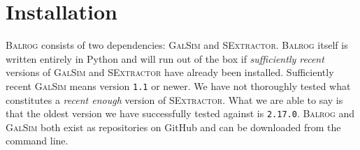 \documentclass[11pt]{book}
\newcommand{\codett}[1]{\texttt{#1}}
\newcommand{\py}{Python}
\newcommand{\galsim}{\textsc{GalSim}}
\newcommand{\balrog}{\textsc{Balrog}}
\newcommand{\sex}{\textsc{SExtractor}}
\newcommand{\opt}[1]{\codett{--#1}}
\newcommand{\ericdate}{\mydate\today}
\begin{document}



\chapter{Installation}
\label{sec:install}

\balrog{} consists of two dependencies: \galsim{} and \sex{}.
\balrog{} itself is written entirely in \py{} and will run out of the box if  
\emph{sufficiently recent} versions of \galsim{} and \sex{} have already been installed.
Sufficiently recent \galsim{} means version \codett{1.1} or newer.
We have not thoroughly tested what constitutes a \emph{recent enough} version of \sex{}.
What we are able to say is that the oldest version we have successfully tested against is \codett{2.17.0}.
\balrog{} and \galsim{} both exist as repositories on GitHub and can be downloaded 
from the command line.
\end{document}
